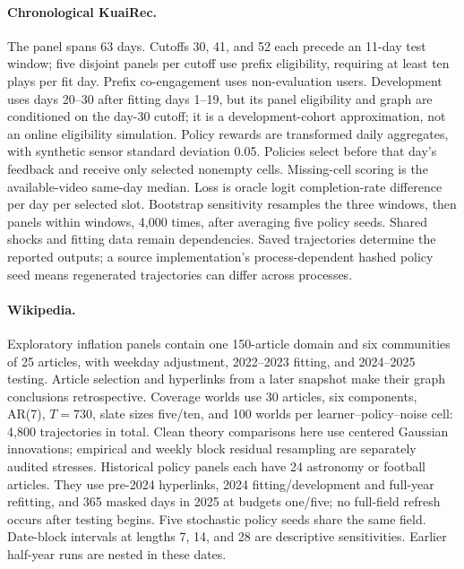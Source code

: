 \documentclass[sigconf,review,anonymous]{acmart}
\begin{document}
\paragraph{Chronological KuaiRec.} The panel spans 63 days. Cutoffs 30, 41, and 52 each precede an 11-day test window; five disjoint panels per cutoff use prefix eligibility, requiring at least ten plays per fit day. Prefix co-engagement uses non-evaluation users. Development uses days 20--30 after fitting days 1--19, but its panel eligibility and graph are conditioned on the day-30 cutoff; it is a development-cohort approximation, not an online eligibility simulation. Policy rewards are transformed daily aggregates, with synthetic sensor standard deviation 0.05. Policies select before that day's feedback and receive only selected nonempty cells. Missing-cell scoring is the available-video same-day median. Loss is oracle logit completion-rate difference per day per selected slot. Bootstrap sensitivity resamples the three windows, then panels within windows, 4,000 times, after averaging five policy seeds. Shared shocks and fitting data remain dependencies. Saved trajectories determine the reported outputs; a source implementation's process-dependent hashed policy seed means regenerated trajectories can differ across processes.

\paragraph{Wikipedia.} Exploratory inflation panels contain one 150-article domain and six communities of 25 articles, with weekday adjustment, 2022--2023 fitting, and 2024--2025 testing. Article selection and hyperlinks from a later snapshot make their graph conclusions retrospective. Coverage worlds use 30 articles, six components, AR(7), $T=730$, slate sizes five/ten, and 100 worlds per learner--policy--noise cell: 4,800 trajectories in total. Clean theory comparisons here use centered Gaussian innovations; empirical and weekly block residual resampling are separately audited stresses. Historical policy panels each have 24 astronomy or football articles. They use pre-2024 hyperlinks, 2024 fitting/development and full-year refitting, and 365 masked days in 2025 at budgets one/five; no full-field refresh occurs after testing begins. Five stochastic policy seeds share the same field. Date-block intervals at lengths 7, 14, and 28 are descriptive sensitivities. Earlier half-year runs are nested in these dates.
\end{document}
